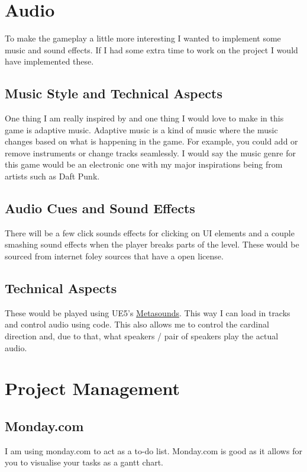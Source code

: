 \documentclass[12pt]{article}
\begin{document}
	\section{Audio}
	To make the gameplay a little more interesting I wanted to implement some music and sound effects. If I had some extra time to work on the project I would have implemented these.
	\subsection{Music Style and Technical Aspects}
 	One thing I am really inspired by and one thing I would love to make in this game is adaptive music. Adaptive music is a kind of music where the music changes based on what is happening in the game. For example, you could add or remove instruments or change tracks seamlessly. I would say the music genre for this game would be an electronic one with my major inspirations being from artists such as Daft Punk.
	\subsection{Audio Cues and Sound Effects}
	There will be a few click sounds effects for clicking on UI elements and a couple smashing sound effects when the player breaks parts of the level. These would be sourced from internet foley sources that have a open license. 
	\subsection{Technical Aspects}
	These would be played using UE5's \href{https://dev.epicgames.com/documentation/en-us/unreal-engine/metasounds-the-next-generation-sound-sources-in-unreal-engine}{Metasounds}. This way I can load in tracks and control audio using code. This also allows me to control the cardinal direction and, due to that, what speakers / pair of speakers play the actual audio.
	
	\section{Project Management}
	\subsection{Monday.com}
	I am using monday.com to act as a to-do list. Monday.com is good as it allows for you to visualise your tasks as a gantt chart.
\end{document}
